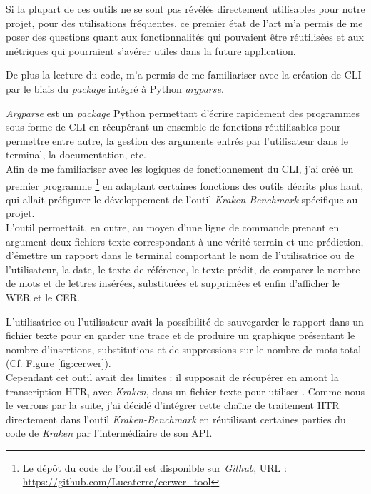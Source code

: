 Si la plupart de ces outils ne se sont pas révélés directement utilisables pour notre projet, pour des utilisations fréquentes, ce premier état de l'art m'a permis de me poser des questions quant aux fonctionnalités qui pouvaient être réutilisées et aux métriques qui pourraient s'avérer utiles dans la future application. 

De plus la lecture du code, m'a permis de me familiariser avec la création de CLI par le biais du \textit{package} intégré à Python \textit{argparse}. 

\textit{Argparse} est un \textit{package} Python permettant d'écrire rapidement des programmes sous forme de CLI en récupérant un ensemble de fonctions réutilisables pour permettre entre autre, la gestion des arguments entrés par l'utilisateur dans le terminal, la documentation, etc.\\

Afin de me familiariser avec les logiques de fonctionnement du CLI, j'ai créé un premier programme \footnote{Le dépôt du code de l'outil  est disponible sur \textit{Github}, URL : \url{https://github.com/Lucaterre/cerwer_tool}} en adaptant certaines fonctions des outils décrits plus haut, qui allait préfigurer le développement de l'outil \textit{Kraken-Benchmark} spécifique au projet.\\

L'outil  permettait, en outre, au moyen d'une ligne de commande prenant en argument deux fichiers texte correspondant à une vérité terrain et une prédiction, d'émettre un rapport dans le terminal comportant le nom de l'utilisatrice ou de l'utilisateur, la date, le texte de référence, le texte prédit, de comparer le nombre de mots et de lettres insérées, substituées et supprimées et enfin d'afficher le WER et le CER.

L'utilisatrice ou l'utilisateur avait la possibilité de sauvegarder le rapport dans un fichier texte pour en garder une trace et de produire un graphique présentant le nombre d'insertions, substitutions et de suppressions sur le nombre de mots total (Cf. Figure \ref{fig:cerwer}).\\

Cependant cet outil avait des limites : il supposait de récupérer en amont la transcription HTR, avec \textit{Kraken}, dans un fichier texte pour utiliser . Comme nous le verrons par la suite, j'ai décidé d'intégrer cette chaîne de traitement HTR directement dans l'outil \textit{Kraken-Benchmark} en réutilisant certaines parties du code de \textit{Kraken} par l'intermédiaire de son API.

